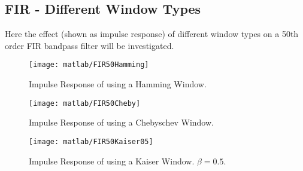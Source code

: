 \clearpage

\subsection{FIR - Different Window Types}
Here the effect (shown as impulse response) of different window types on a 50th order FIR bandpass filter will be investigated.

\begin{figure}[!htb]
	\centering
	\texttt{[image: matlab/FIR50Hamming]}
	\caption{Impulse Response of using a Hamming Window.}
	\label{fig:FIR_50Hamming}
\end{figure}

\begin{figure}[!htb]
	\centering
	\texttt{[image: matlab/FIR50Cheby]}
	\caption{Impulse Response of using a Chebyschev Window.}
	\label{fig:FIR_50Cheby}
\end{figure}

\begin{figure}[!htb]
	\centering
	\texttt{[image: matlab/FIR50Kaiser05]}
	\caption{Impulse Response of using a Kaiser Window. $\beta=0.5$.}
	\label{fig:FIR_50Kaiser}
\end{figure}